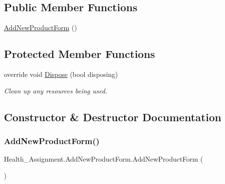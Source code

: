 \subsection*{Public Member Functions}
\begin{DoxyCompactItemize}
\item 
\hyperlink{class_health___assignment_1_1_add_new_product_form_a6c0063fefeea505dc9d226921881fe1f}{Add\+New\+Product\+Form} ()
\end{DoxyCompactItemize}
\subsection*{Protected Member Functions}
\begin{DoxyCompactItemize}
\item 
override void \hyperlink{class_health___assignment_1_1_add_new_product_form_a97a68d272991de4e926b7f701933ff19}{Dispose} (bool disposing)
\begin{DoxyCompactList}\small\item\em Clean up any resources being used. \end{DoxyCompactList}\end{DoxyCompactItemize}


\subsection{Constructor \& Destructor Documentation}
\mbox{\label{class_health___assignment_1_1_add_new_product_form_a6c0063fefeea505dc9d226921881fe1f}} 
\subsubsection{\texorpdfstring{Add\+New\+Product\+Form()}{AddNewProductForm()}}
{\footnotesize\ttfamily Health\+\_\+\+Assignment.\+Add\+New\+Product\+Form.\+Add\+New\+Product\+Form (\begin{DoxyParamCaption}{ }\end{DoxyParamCaption})\hspace{0.3cm}{\ttfamily [inline]}}



